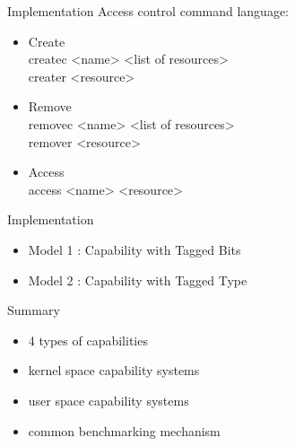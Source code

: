 \documentclass[11pt]{beamer}
\begin{document}
\begin{frame}{Implementation}
Access control command language:
\vfill
\begin{itemize}
\item Create\\
  createc <name> <list of resources>\\
  creater <resource>\\
\vfill
\item Remove\\
  removec <name> <list of resources>\\
  remover <resource>\\
\vfill
\item Access\\
  access <name> <resource>
\vfill
\end{itemize}

\end{frame}

\begin{frame}{Implementation}
\begin{itemize}
\vfill
\item Model 1 : Capability with Tagged Bits
\vfill
\item Model 2 : Capability with Tagged Type
\vfill
\end {itemize}
\end{frame}

\begin{frame}{Summary}
  \begin{itemize}
    \vfill
  \item 4 types of capabilities
    \vfill
  \item kernel space capability systems
    \vfill
  \item user space capability systems
    \vfill
  \item common benchmarking mechanism
    \vfill
  \end{itemize}
\end{frame}
\end{document}
